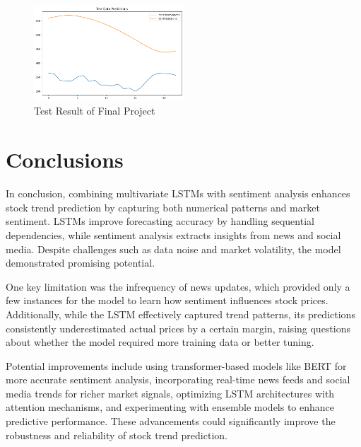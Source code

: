 \documentclass[12pt,a4paper]{article}
\begin{document}
\begin{figure}[!h]
    \centering
    \includegraphics[width=0.5\textwidth]{Week4_test_results.png} %
    \caption{Test Result of Final Project}
    \label{fig16}
\end{figure}

\newpage

\section{Conclusions}
In conclusion, combining multivariate LSTMs with sentiment analysis enhances stock trend prediction by capturing both numerical patterns and market sentiment. LSTMs improve forecasting accuracy by handling sequential dependencies, while sentiment analysis extracts insights from news and social media. Despite challenges such as data noise and market volatility, the model demonstrated promising potential.

One key limitation was the infrequency of news updates, which provided only a few instances for the model to learn how sentiment influences stock prices. Additionally, while the LSTM effectively captured trend patterns, its predictions consistently underestimated actual prices by a certain margin, raising questions about whether the model required more training data or better tuning.

Potential improvements include using transformer-based models like BERT for more accurate sentiment analysis, incorporating real-time news feeds and social media trends for richer market signals, optimizing LSTM architectures with attention mechanisms, and experimenting with ensemble models to enhance predictive performance. These advancements could significantly improve the robustness and reliability of stock trend prediction.
\end{document}
